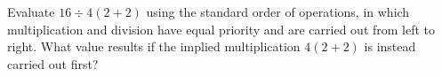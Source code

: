 Evaluate $16\div4(2+2)$ using the standard order of operations, in which multiplication and division have equal priority and are carried out from left to right. What value results if the implied multiplication $4(2+2)$ is instead carried out first?

